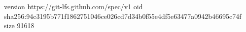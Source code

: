 version https://git-lfs.github.com/spec/v1
oid sha256:94c3195b771f1862751046ce026cd7d34b0f55e4df5e63477a0942b46695c74f
size 91618
